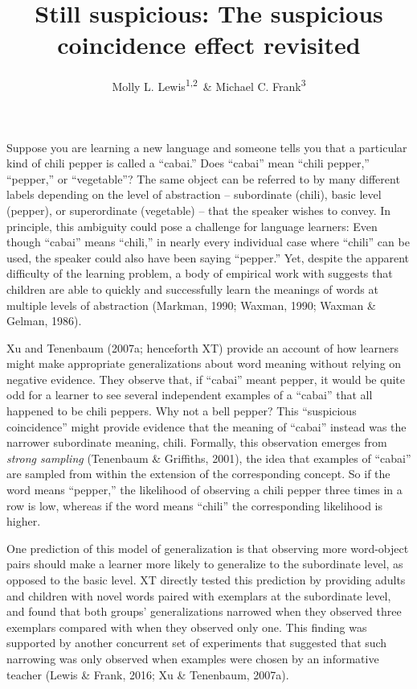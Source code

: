 \documentclass[english,floatsintext,man]{apa6}
\title{Still suspicious: The suspicious coincidence effect revisited}
\author{Molly L. Lewis\textsuperscript{1,2}~\& Michael C. Frank\textsuperscript{3}}
\affiliation{
    \vspace{0.5cm}
          \textsuperscript{1} Computation Institute, University of Chicago\\
          \textsuperscript{2} Department of Psychology, University of Wisconsin, Madison\\
          \textsuperscript{3} Department of Psychology, Stanford University  }
\theoremstyle{definition}
\theoremstyle{definition}
\theoremstyle{definition}
\theoremstyle{remark}
\begin{document}
\maketitle

\setcounter{secnumdepth}{0}



Suppose you are learning a new language and someone tells you that a
particular kind of chili pepper is called a \enquote{cabai.} Does
\enquote{cabai} mean \enquote{chili pepper,} \enquote{pepper,} or
\enquote{vegetable}? The same object can be referred to by many
different labels depending on the level of abstraction -- subordinate
(chili), basic level (pepper), or superordinate (vegetable) -- that the
speaker wishes to convey. In principle, this ambiguity could pose a
challenge for language learners: Even though \enquote{cabai} means
\enquote{chili,} in nearly every individual case where \enquote{chili}
can be used, the speaker could also have been saying \enquote{pepper.}
Yet, despite the apparent difficulty of the learning problem, a body of
empirical work with suggests that children are able to quickly and
successfully learn the meanings of words at multiple levels of
abstraction (Markman, 1990; Waxman, 1990; Waxman \& Gelman, 1986).

Xu and Tenenbaum (2007a; henceforth XT) provide an account of how
learners might make appropriate generalizations about word meaning
without relying on negative evidence. They observe that, if
\enquote{cabai} meant pepper, it would be quite odd for a learner to see
several independent examples of a \enquote{cabai} that all happened to
be chili peppers. Why not a bell pepper? This \enquote{suspicious
coincidence} might provide evidence that the meaning of \enquote{cabai}
instead was the narrower subordinate meaning, chili. Formally, this
observation emerges from \emph{strong sampling} (Tenenbaum \& Griffiths,
2001), the idea that examples of \enquote{cabai} are sampled from within
the extension of the corresponding concept. So if the word means
\enquote{pepper,} the likelihood of observing a chili pepper three times
in a row is low, whereas if the word means \enquote{chili} the
corresponding likelihood is higher.

One prediction of this model of generalization is that observing more
word-object pairs should make a learner more likely to generalize to the
subordinate level, as opposed to the basic level. XT directly tested
this prediction by providing adults and children with novel words paired
with exemplars at the subordinate level, and found that both groups'
generalizations narrowed when they observed three exemplars compared
with when they observed only one. This finding was supported by another
concurrent set of experiments that suggested that such narrowing was
only observed when examples were chosen by an informative teacher (Lewis
\& Frank, 2016; Xu \& Tenenbaum, 2007a).
\end{document}
